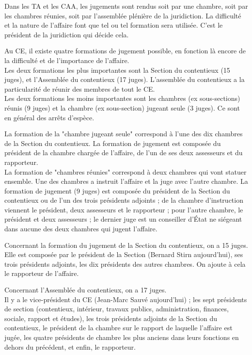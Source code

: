 \documentclass[10pt, a4paper, openany]{book}
\begin{document}
Dans les TA et les CAA, les jugements sont rendus soit par une chambre, soit par les chambres réunies, soit par l'assemblée plénière de la juridiction. La difficulté et la nature de l'affaire font que tel ou tel formation sera utilisée. C'est le président de la juridiction qui décide cela.


Au CE, il existe quatre formations de jugement possible, en fonction là encore de la difficulté et de l'importance de l'affaire. \\
Les deux formations les plus importantes sont la Section du contentieux (15 juges), et l'Assemblée du contentieux (17 juges). L'assemblée du contentieux a la particularité de réunir des membres de tout le CE. \\
Les deux formations les moins importantes sont les chambres (ex sous-sections) réunis (9 juges) et la chambre (ex sous-section) jugeant seule (3 juges). Ce sont en général des arrêts d'espèce.


La formation de la "chambre jugeant seule" correspond à l'une des dix chambres de la Section du contentieux. La formation de jugement est composée du président de la chambre chargée de l'affaire, de l'un de ses deux assesseurs et du rapporteur. \\
La formation de "chambres réunies" correspond à deux chambres qui vont statuer ensemble. Une des chambres a instruit l'affaire et la juge avec l'autre chambre. La formation de jugement (9 juges) est composée du président de la Section du contentieux ou de l'un des trois présidents adjoints ; de la chambre d'instruction viennent le président, deux assesseurs et le rapporteur ; pour l'autre chambre, le président et deux assesseurs ; le dernier juge est un conseiller d'État ne siégeant dans aucune des deux chambres qui jugent l'affaire. 


Concernant la formation du jugement de la Section du contentieux, on a 15 juges. \\
Elle est composée par le président de la Section (Bernard Stirn aujourd'hui), ses trois présidents adjoints, les dix présidents des autres chambres. On ajoute à cela le rapporteur de l'affaire. 


Concernant l'Assemblée du contentieux, on a 17 juges. \\
Il y a le vice-président du CE (Jean-Marc Sauvé aujourd'hui) ; les sept présidents de section (contentieux, intérieur, travaux publics, administration, finances, sociale, rapport et études), les trois présidents adjoints de la Section du contentieux, le président de la chambre sur le rapport de laquelle l'affaire est jugée, les quatre présidents de chambre les plus anciens dans leurs fonctions en dehors du précédent, et enfin, le rapporteur. 
\end{document}
